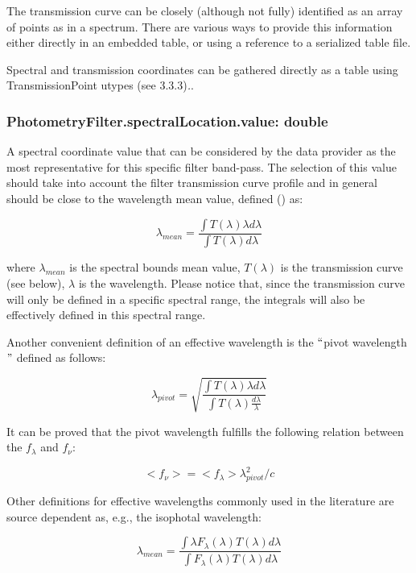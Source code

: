 \documentclass[11pt,a4paper]{ivoa}
\begin{document}
The transmission curve can be closely (although not fully) identified as an array of points as in a spectrum. There are various ways to provide this information either directly in an embedded table, or using a reference to a serialized table file.
\par

Spectral and transmission coordinates can be gathered directly as a table using TransmissionPoint utypes (see 3.3.3)\textit{.}.
\par

\subsubsection{PhotometryFilter.spectralLocation.value: double}
A spectral coordinate value that can be considered by the data provider as the most representative for this specific filter band-pass. The selection of this value should take into account the filter transmission curve profile and in general should be close to the wavelength mean value, defined (\citep{1982AJ.....87..670O}) as:
\par
\[
\lambda_{mean} = \frac{\int T(\lambda)\lambda d\lambda}{\int T(\lambda)d\lambda}
\]

where $\lambda_{mean}$ is the spectral bounds mean value, $T(\lambda)$ is the transmission curve (see below), $\lambda$ is the wavelength. Please notice that, since the transmission curve will only be defined in a specific spectral range, the integrals will also be effectively defined in this spectral range.
\par

Another convenient definition of an effective wavelength is the $``$pivot wavelength$"$  defined as follows:
\par

\[
\lambda_{pivot} = \sqrt{\frac{\int T(\lambda)\lambda d\lambda}{\int T(\lambda)\frac{d\lambda}{\lambda}}}
\]

It can be proved that the pivot wavelength fulfills the following relation between the $f_\lambda$ and  $f_\nu $:
\par

\[
<f_\nu >=<f_\lambda >\lambda^2_{pivot}/c
\]

Other definitions for effective wavelengths commonly used in the literature are source dependent as, e.g., the isophotal wavelength:
\par
\[
\lambda_{mean} = \frac{\int \lambda F_\lambda(\lambda)T(\lambda)d\lambda}{\int F_\lambda(\lambda)T(\lambda)d\lambda}
\]
\end{document}

